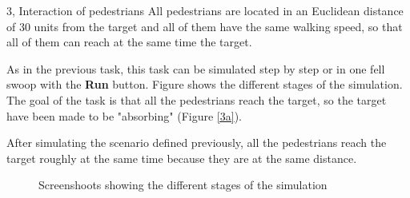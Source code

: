 \documentclass[10pt,a4paper]{article}
\begin{document}
\begin{task}{3, Interaction of pedestrians}
All pedestrians are located in an Euclidean distance of 30 units from the target and all of them have the same walking speed, so that all of them can reach at the same time the target.

As in the previous task, this task can be simulated step by step or in one fell swoop with the \textbf{Run} button. Figure  shows the different stages of the simulation. The goal of the task is that all the pedestrians reach the target, so the target have been made to be "absorbing" (Figure \ref{3a}). 

After simulating the scenario defined previously, all the pedestrians reach the target roughly at the same time because they are at the same distance.

\begin{figure} [!h]
 \centering
 \caption{Screenshoots showing the different stages of the simulation}
 \label{f2}
\end{figure}

\end{task}


\pagebreak
\end{document}
